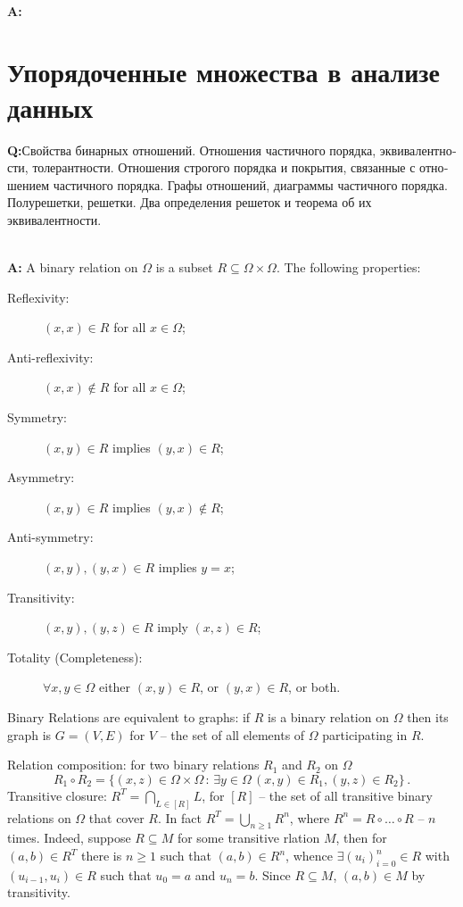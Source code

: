 \documentclass[a4paper]{article}
\newcommand{\rus}[1]{\foreignlanguage{russian}{#1}}
\begin{document}
\hfill\\\noindent\textbf{A:}



\section{\rus{Упорядоченные множества в анализе данных}} %
\label{sec:ordered_sets}

\noindent\textbf{Q:}\rus{Свойства бинарных отношений. Отношения частичного
порядка, эквивалентности, толерантности. Отношения строгого порядка и
покрытия, связанные с отношением частичного порядка. Графы отношений,
диаграммы частичного порядка. Полурешетки, решетки. Два определения решеток
и теорема об их эквивалентности.}

\hfill\\\noindent\textbf{A:}
A binary relation on $\Omega$ is a subset $R\subseteq \Omega\times \Omega$.
The following properties:
\begin{description}
    \item[Reflexivity:] $(x, x)\in R$ for all $x\in\Omega$;
    \item[Anti-reflexivity:] $(x, x)\notin R$ for all $x\in\Omega$;
    \item[Symmetry:] $(x, y)\in R$ implies $(y, x)\in R$;
    \item[Asymmetry:] $(x, y)\in R$ implies $(y, x)\notin R$;
    \item[Anti-symmetry:] $(x, y), (y,x)\in R$ implies $y=x$;
    \item[Transitivity:] $(x,y), (y,z)\in R$ imply $(x,z)\in R$;
    \item[Totality (Completeness):] $\forall x, y\in \Omega$ either $(x,y)\in R$,
    or $(y,x)\in R$, or both.
\end{description}
Binary Relations are equivalent to graphs: if $R$ is a binary relation on $\Omega$
then its graph is $G = (V, E)$ for $V$ -- the set of all elements of $\Omega$
participating in $R$.

\noindent Relation composition: for two binary relations $R_1$ and $R_2$ on $\Omega$
$$ R_1\circ R_2
    = \{(x,z)\in \Omega\times\Omega
        \,:\, \exists y\in \Omega\, (x,y)\in R_1, (y,z)\in R_2\}
    \,. $$
\noindent Transitive closure:
$R^T = \bigcap_{L\in [R]} L$, for $[R]$ -- the set of all transitive binary
relations on $\Omega$ that cover $R$. In fact $R^T = \bigcup_{n\geq1} R^n$,
where $R^n = R\circ \ldots \circ R$ -- $n$ times. Indeed, suppose $R\subseteq M$
for some transitive rlation $M$, then for $(a,b)\in R^T$ there is $n\geq 1$
such that $(a,b)\in R^n$, whence $\exists (u_i)_{i=0}^n\in R$ with $(u_{i-1}, u_i)\in R$
such that $u_0=a$ and $u_n=b$. Since $R\subseteq M$, $(a,b)\in M$ by transitivity.
\end{document}
